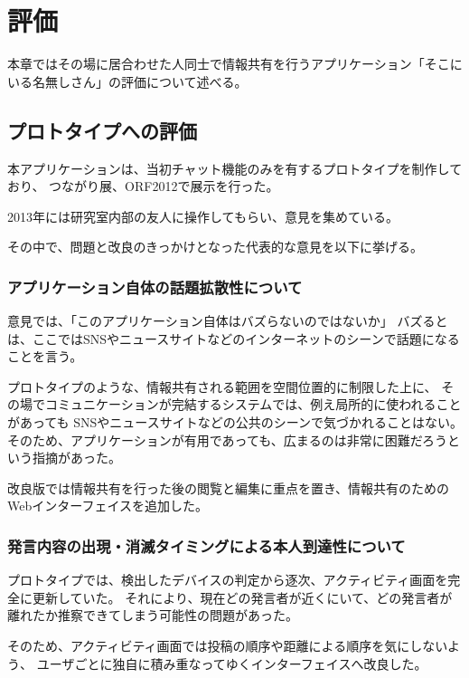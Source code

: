 \chapter{評価}\label{chap:hyoka}

本章ではその場に居合わせた人同士で情報共有を行うアプリケーション「そこにいる名無しさん」の評価について述べる。

\newpage

\section{プロトタイプへの評価}

本アプリケーションは、当初チャット機能のみを有するプロトタイプを制作しており、
つながり展、ORF2012で展示を行った。

2013年には研究室内部の友人に操作してもらい、意見を集めている。

その中で、問題と改良のきっかけとなった代表的な意見を以下に挙げる。

\subsection{アプリケーション自体の話題拡散性について}

意見では、「このアプリケーション自体はバズらないのではないか」
バズるとは、ここではSNSやニュースサイトなどのインターネットのシーンで話題になることを言う。

プロトタイプのような、情報共有される範囲を空間位置的に制限した上に、
その場でコミュニケーションが完結するシステムでは、例え局所的に使われることがあっても
SNSやニュースサイトなどの公共のシーンで気づかれることはない。
そのため、アプリケーションが有用であっても、広まるのは非常に困難だろうという指摘があった。

改良版では情報共有を行った後の閲覧と編集に重点を置き、情報共有のためのWebインターフェイスを追加した。

\subsection{発言内容の出現・消滅タイミングによる本人到達性について}

プロトタイプでは、検出したデバイスの判定から逐次、アクティビティ画面を完全に更新していた。
それにより、現在どの発言者が近くにいて、どの発言者が離れたか推察できてしまう可能性の問題があった。

そのため、アクティビティ画面では投稿の順序や距離による順序を気にしないよう、
ユーザごとに独自に積み重なってゆくインターフェイスへ改良した。
